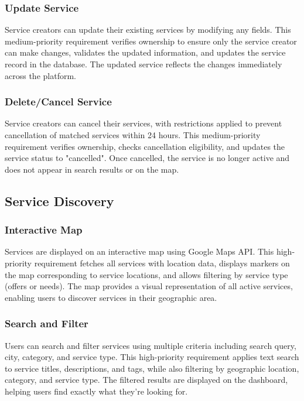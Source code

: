 \documentclass[12pt,a4paper]{report}
\begin{document}
\subsubsection{Update Service}

Service creators can update their existing services by modifying any fields. This medium-priority requirement verifies ownership to ensure only the service creator can make changes, validates the updated information, and updates the service record in the database. The updated service reflects the changes immediately across the platform.

\subsubsection{Delete/Cancel Service}

Service creators can cancel their services, with restrictions applied to prevent cancellation of matched services within 24 hours. This medium-priority requirement verifies ownership, checks cancellation eligibility, and updates the service status to "cancelled". Once cancelled, the service is no longer active and does not appear in search results or on the map.

\subsection{Service Discovery}

\subsubsection{Interactive Map}

Services are displayed on an interactive map using Google Maps API. This high-priority requirement fetches all services with location data, displays markers on the map corresponding to service locations, and allows filtering by service type (offers or needs). The map provides a visual representation of all active services, enabling users to discover services in their geographic area.

\subsubsection{Search and Filter}

Users can search and filter services using multiple criteria including search query, city, category, and service type. This high-priority requirement applies text search to service titles, descriptions, and tags, while also filtering by geographic location, category, and service type. The filtered results are displayed on the dashboard, helping users find exactly what they're looking for.
\end{document}
